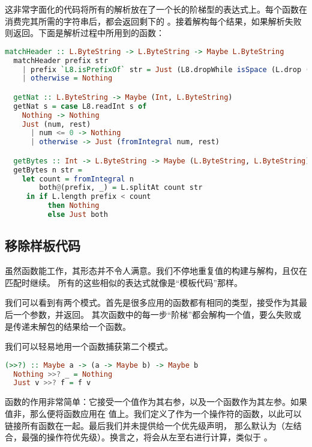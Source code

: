 \documentclass[./main.tex]{subfiles}
\begin{document}
这非常字面化的代码将所有的解析放在了一个长的阶梯型的表达式上。每个函数在消费完其所需的字符串后，都会返回剩下的
。接着解构每个结果，如果解析失败则返回。下面是解析过程中所用到的函数：

\begin{lstlisting}[language=Haskell]
  matchHeader :: L.ByteString -> L.ByteString -> Maybe L.ByteString
  matchHeader prefix str
    | prefix `L8.isPrefixOf` str = Just (L8.dropWhile isSpace (L.drop (L.length prefix) str))
    | otherwise = Nothing

  getNat :: L.ByteString -> Maybe (Int, L.ByteString)
  getNat s = case L8.readInt s of
    Nothing -> Nothing
    Just (num, rest)
      | num <= 0 -> Nothing
      | otherwise -> Just (fromIntegral num, rest)

  getBytes :: Int -> L.ByteString -> Maybe (L.ByteString, L.ByteString)
  getBytes n str =
    let count = fromIntegral n
        both@(prefix, _) = L.splitAt count str
     in if L.length prefix < count
          then Nothing
          else Just both
\end{lstlisting}

\subsection*{移除样板代码}

虽然函数能工作，其形态并不令人满意。我们不停地重复值的构建与解构，且仅在匹配时继续。
所有的这些相似的表达式就像是“模板代码”那样。

我们可以看到有两个模式。首先是很多应用的函数都有相同的类型，接受作为其最后一个参数，并返回。
其次函数中的每一步“阶梯”都会解构一个值，要么失败或是传递未解包的结果给一个函数。

我们可以轻易地用一个函数捕获第二个模式。

\begin{lstlisting}[language=Haskell]
  (>>?) :: Maybe a -> (a -> Maybe b) -> Maybe b
  Nothing >>? _ = Nothing
  Just v >>? f = f v
\end{lstlisting}

函数的作用非常简单：它接受一个值作为其右参，以及一个函数作为其左参。如果值非，那么便将函数应用在
值上。我们定义了作为一个操作符的函数，以此可以链接所有函数在一起。最后我们并未提供给一个优先级声明，
那么默认为（左结合，最强的操作符优先级）。换言之，将会从左至右进行计算，类似于
。
\end{document}
